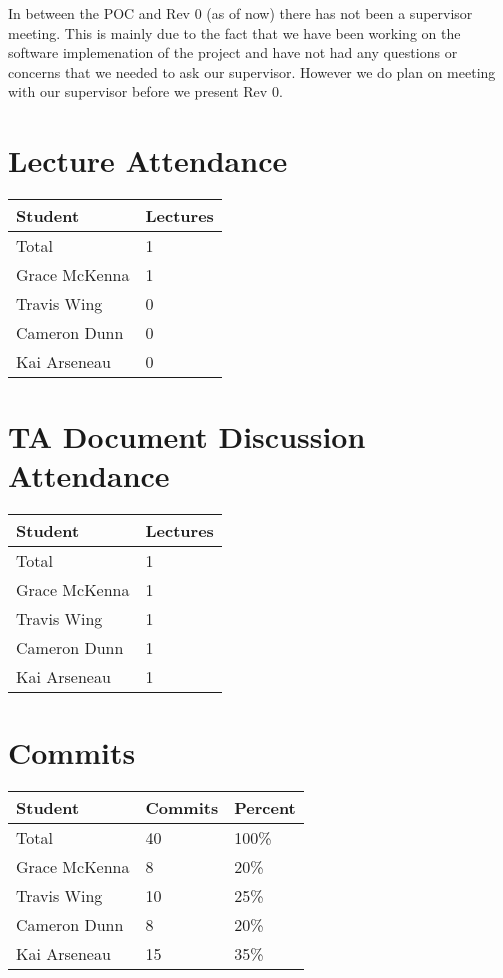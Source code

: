 \documentclass{article}
\begin{document}
In between the POC and Rev 0 (as of now) there has not been a supervisor meeting. This is mainly due to the fact
that we have been working on the software implemenation of the project and have not had any questions or concerns that we needed to ask our supervisor.
However we do plan on meeting with our supervisor before we present Rev 0.


\section{Lecture Attendance}


\begin{table}[H]
\centering
\begin{tabular}{ll}
\toprule
\textbf{Student} & \textbf{Lectures}\\
\midrule
Total & 1\\
Grace McKenna & 1\\
Travis Wing & 0\\
Cameron Dunn & 0\\
Kai Arseneau & 0\\
\bottomrule
\end{tabular}
\end{table}


\section{TA Document Discussion Attendance}


\begin{table}[H]
\centering
\begin{tabular}{ll}
\toprule
\textbf{Student} & \textbf{Lectures}\\
\midrule
Total & 1\\
Grace McKenna & 1\\
Travis Wing & 1\\
Cameron Dunn & 1\\
Kai Arseneau & 1\\
\bottomrule
\end{tabular}
\end{table}


\section{Commits}

\begin{table}[H]
\centering
\begin{tabular}{lll}
\toprule
\textbf{Student} & \textbf{Commits} & \textbf{Percent}\\
\midrule
Total & 40 & 100\% \\
Grace McKenna & 8 & 20\% \\
Travis Wing & 10 & 25\% \\
Cameron Dunn & 8 & 20\% \\
Kai Arseneau & 15 & 35\% \\
\bottomrule
\end{tabular}
\end{table}
\end{document}
